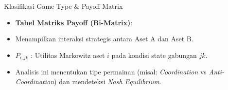 \documentclass{beamer}
\begin{document}
\begin{frame}{Klasifikasi Game Type \& Payoff Matrix}
    \begin{itemize}
        \item \textbf{Tabel Matriks Payoff (Bi-Matrix)}:
        \item Menampilkan interaksi strategis antara Aset A dan Aset B.
    \end{itemize}
    
    \begin{table}[]
        \centering
        \caption{Matriks Payoff: BBCA.JK vs ASII.JK (Sampel)}
    \end{table}

    \begin{itemize}
        \item $P_{i,jk}$ : Utilitas Markowitz aset $i$ pada kondisi state gabungan $jk$.
        \item Analisis ini menentukan tipe permainan (misal: \textit{Coordination} vs \textit{Anti-Coordination}) dan mendeteksi \textit{Nash Equilibrium}.
    \end{itemize}
\end{frame}
\end{document}
